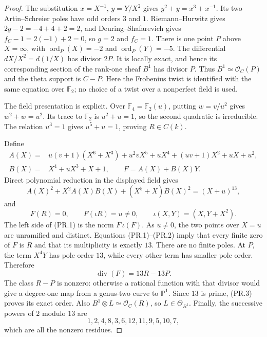 \begin{proof}
The substitution $x=X^{-1}$, $y=Y/X^2$ gives
$y^2+y=x^3+x^{-1}$. Its two Artin--Schreier poles have odd orders
$3$ and $1$. Riemann--Hurwitz gives $2g-2=-4+4+2=2$, and
Deuring--Shafarevich gives $f_C-1=2(-1)+2=0$, so $g=2$ and $f_C=1$.
There is one point $P$ above $X=\infty$, with
$\operatorname{ord}_P(X)=-2$ and $\operatorname{ord}_P(Y)=-5$.
The differential $dX/X^2=d(1/X)$ has divisor $2P$.
It is locally exact, and hence its corresponding section of the
rank-one sheaf $B^1$ has divisor $P$. Thus
$B^1\simeq\mathcal O_C(P)$ and the theta support is $C-P$.
Here the Frobenius twist is identified with the same equation over
$\mathbb F_2$; no choice of a twist over a nonperfect field is used.

The field presentation is explicit. Over $\mathbb F_4=\mathbb F_2(u)$,
putting $w=v/u^2$ gives $w^2+w=u^2$. Its trace to $\mathbb F_2$ is
$u^2+u=1$, so the second quadratic is irreducible. The relation
$u^3=1$ gives $u^5+u=1$, proving $R\in C(k)$.

Define
\begin{align*}
 A(X)={}&u(v+1)(X^6+X^3)+u^2vX^5+uX^4
                 +(uv+1)X^2+uX+u^2,\\
 B(X)={}&X^4+uX^3+X+1,\qquad F=A(X)+B(X)Y.
\end{align*}
Direct polynomial reduction in the displayed field gives
\[
 A(X)^2+X^2A(X)B(X)+(X^5+X)B(X)^2=(X+u)^{13},
 \tag{PR.1}
\]
and
\[
 F(R)=0,\qquad F(\iota R)=u\ne0,
 \qquad\iota(X,Y)=(X,Y+X^2).
 \tag{PR.2}
\]
The left side of (PR.1) is the norm $F\,\iota(F)$.
As $u\ne0$, the two points over $X=u$ are unramified and distinct.
Equations (PR.1)--(PR.2) imply that every finite zero of $F$ is $R$
and that its multiplicity is exactly $13$. There are no finite poles.
At $P$, the term $X^4Y$ has pole order $13$, while every other term
has smaller pole order. Therefore
\[
 \operatorname{div}(F)=13R-13P.\tag{PR.3}
\]
The class $R-P$ is nonzero: otherwise a rational function with that
divisor would give a degree-one map from a genus-two curve to
$\mathbb P^1$. Since $13$ is prime, (PR.3) proves its exact order.
Also $B^1\otimes L\simeq\mathcal O_C(R)$, so $L\in\Theta_{B^1}$.
Finally, the successive powers of $2$ modulo $13$ are
\[
 1,2,4,8,3,6,12,11,9,5,10,7,
\]
which are all the nonzero residues.
\end{proof}

